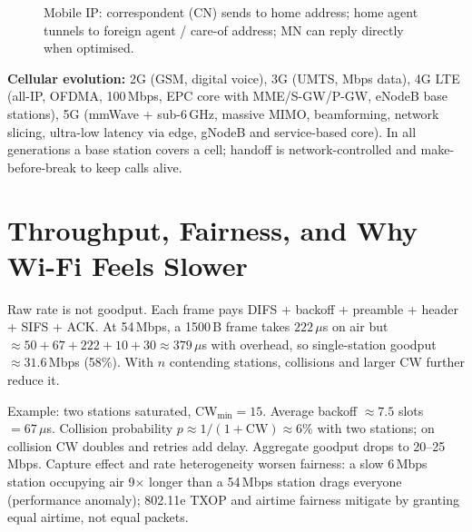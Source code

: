 \begin{figure}[h]
\centering
{}
\caption{Mobile IP: correspondent (CN) sends to home address; home agent tunnels to foreign agent / care-of address; MN can reply directly when optimised.}
\label{fig:mobile-ip}
\end{figure}

\textbf{Cellular evolution:} 2G (GSM, digital voice), 3G (UMTS, Mbps data), 4G LTE (all-IP, OFDMA, 100\,Mbps, EPC core with MME/S-GW/P-GW, eNodeB base stations), 5G (mmWave + sub-6\,GHz, massive MIMO, beamforming, network slicing, ultra-low latency via edge, gNodeB and service-based core). In all generations a base station covers a cell; handoff is network-controlled and make-before-break to keep calls alive.

\section{Throughput, Fairness, and Why Wi-Fi Feels Slower}\label{sec:throughput}
Raw rate is not goodput. Each frame pays DIFS + backoff + preamble + header + SIFS + ACK. At 54\,Mbps, a 1500\,B frame takes $222\,\mu$s on air but $\approx 50+67+222+10+30\approx 379\,\mu$s with overhead, so single-station goodput $\approx 31.6$\,Mbps (58\%). With $n$ contending stations, collisions and larger CW further reduce it.

Example: two stations saturated, CW$_{\min}=15$. Average backoff $\approx 7.5$ slots $=67\,\mu$s. Collision probability $p\approx 1/(1+\mathrm{CW})\approx 6\%$ with two stations; on collision CW doubles and retries add delay. Aggregate goodput drops to 20--25\,Mbps. Capture effect and rate heterogeneity worsen fairness: a slow 6\,Mbps station occupying air 9$\times$ longer than a 54\,Mbps station drags everyone (performance anomaly); 802.11e TXOP and airtime fairness mitigate by granting equal airtime, not equal packets.

